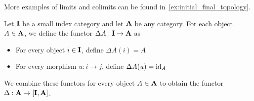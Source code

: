 \begin{note}
  More examples of limits and colimits can be found in~\cref{ex:initial_final_topology}.
\end{note}

\begin{definition}\label{def:diagonal_functor}\cite[143]{Leinster2014}
  Let $\operatorname{\mathbf{I}}$ be a small index category and let $\operatorname{\mathbf{A}}$ be any category. For each object $A \in \operatorname{\mathbf{A}}$, we define the functor $\Delta A: \operatorname{\mathbf{I}} \to \operatorname{\mathbf{A}}$ as
  \begin{itemize}
    \item For every object $i \in \operatorname{\mathbf{I}}$, define $\Delta A(i) = A$
    \item For every morphism $u: i \to j$, define $\Delta A(u) = \operatorname{id}_A$
  \end{itemize}

  We combine these functors for every object $A \in \operatorname{\mathbf{A}}$ to obtain the functor $\Delta: \operatorname{\mathbf{A}} \to [\operatorname{\mathbf{I}}, \operatorname{\mathbf{A}}]$.
\end{definition}

